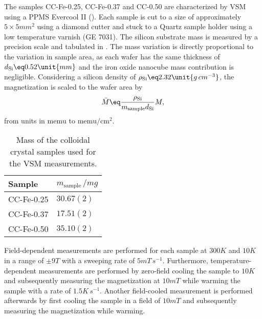 \documentclass[\main/dresen_thesis.tex]{subfiles}
\begin{document}
    The samples CC-Fe-0.25, CC-Fe-0.37 and CC-0.50 are characterized by VSM using a PPMS Evercool II ().
    Each sample is cut to a size of approximately $5 \times 5 \unit{mm^2}$ using a diamond cutter and stuck to a Quartz sample holder using a low temperature varnish (GE 7031).
    The silicon substrate mass is measured by a precision scale and tabulated in .
    The mass variation is directly proportional to the variation in sample area, as each wafer has the same thickness of $d_\mathrm{Si} \eq 0.52 \unit{mm}$ and the iron oxide nanocube mass contribution is negligible.
    Considering a silicon density of $\rho_\mathrm{Si} \eq 2.32 \unit{g \, cm^{-3}}$, the magnetization is scaled to the wafer area by
    \begin{align}
      \bar{M} \eq \frac{\rho_\mathrm{Si}}{m_\mathrm{sample} d_\mathrm{Si}} M,
    \end{align}
    from units in $\mathrm{memu}$ to $\mathrm{memu / cm^2}$.

    \begin{table}[htbp]
      \centering
      \caption{\label{tab:colloidalCrystals:layerCharacterization:ppmsMasses}Mass of the colloidal crystal samples used for the VSM measurements.}
      \begin{tabular}{ l | l}
        \rule{0pt}{2ex} \textbf{Sample}  & $m_\mathrm{sample} \, / \unit{mg}$ \\
        \hline
        \rule{0pt}{2ex} CC-Fe-0.25   & $30.67(2)$ \\
        \rule{0pt}{2ex} CC-Fe-0.37   & $17.51(2)$ \\
        \rule{0pt}{2ex} CC-Fe-0.50   & $35.10(2)$ \\
        \hline
      \end{tabular}
    \end{table}

    Field-dependent measurements are performed for each sample at $300 \unit{K}$ and $10 \unit{K}$ in a range of $\pm 9 \unit{T}$ with a sweeping rate of $5 \unit{mT \, s^{-1}}$.
    Furthermore, temperature-dependent measurements are performed by zero-field cooling the sample to $10 \unit{K}$ and subsequently measuring the magnetization at $10 \unit{mT}$ while warming the sample with a rate of $1.5 \unit{K \, s^{-1}}$.
    Another field-cooled measurement is performed afterwards by first cooling the sample in a field of $10 \unit{mT}$ and subsequently measuring the magnetization while warming.
\end{document}
